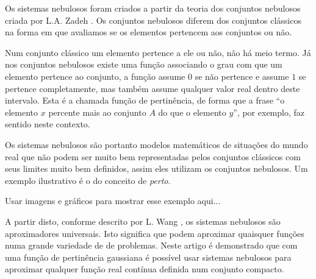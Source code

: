 Os sistemas nebulosos foram criados a partir da teoria dos conjuntos nebulosos criada por L.A. Zadeh \citep{fuzzy_1}. Os conjuntos nebulosos diferem dos conjuntos clássicos na forma em que avaliamos se os elementos pertencem aos conjuntos ou não. 

Num conjunto clássico um elemento pertence a ele ou não, não há meio termo. Já nos conjuntos nebulosos existe uma função associando o grau com que um elemento pertence ao conjunto, a função assume $0$ se não pertence e assume $1$ se pertence completamente, mas também assume qualquer valor real dentro deste intervalo. Esta é a chamada função de pertinência, de forma que a frase ``o elemento $x$ percente mais ao conjunto $A$ do que o elemento $y$'', por exemplo, faz sentido neste contexto.

Os sistemas nebulosos são portanto modelos matemáticos de situações do mundo real que não podem ser muito bem representadas pelos conjuntos clássicos com seus limites muito bem definidos, assim eles utilizam os conjuntos nebulosos. Um exemplo ilustrativo é o do conceito de \emph{perto}.

Usar imagens e gráficos para mostrar esse exemplo aqui...

A partir disto, conforme descrito por L. Wang \citep{fuzzy_2}, os sistemas nebulosos são aproximadores universais. Isto significa que podem aproximar quaisquer funções numa grande variedade de de problemas. Neste artigo é demonstrado que com uma função de pertinência gaussiana é possível usar sistemas nebulosos para aproximar qualquer função real contínua definida num conjunto compacto.